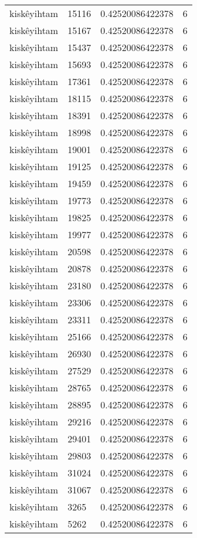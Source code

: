\begin{longtable}{llll}
kiskêyihtam & 15116 & 0.42520086422378 & 6 \\
kiskêyihtam & 15167 & 0.42520086422378 & 6 \\
kiskêyihtam & 15437 & 0.42520086422378 & 6 \\
kiskêyihtam & 15693 & 0.42520086422378 & 6 \\
kiskêyihtam & 17361 & 0.42520086422378 & 6 \\
kiskêyihtam & 18115 & 0.42520086422378 & 6 \\
kiskêyihtam & 18391 & 0.42520086422378 & 6 \\
kiskêyihtam & 18998 & 0.42520086422378 & 6 \\
kiskêyihtam & 19001 & 0.42520086422378 & 6 \\
kiskêyihtam & 19125 & 0.42520086422378 & 6 \\
kiskêyihtam & 19459 & 0.42520086422378 & 6 \\
kiskêyihtam & 19773 & 0.42520086422378 & 6 \\
kiskêyihtam & 19825 & 0.42520086422378 & 6 \\
kiskêyihtam & 19977 & 0.42520086422378 & 6 \\
kiskêyihtam & 20598 & 0.42520086422378 & 6 \\
kiskêyihtam & 20878 & 0.42520086422378 & 6 \\
kiskêyihtam & 23180 & 0.42520086422378 & 6 \\
kiskêyihtam & 23306 & 0.42520086422378 & 6 \\
kiskêyihtam & 23311 & 0.42520086422378 & 6 \\
kiskêyihtam & 25166 & 0.42520086422378 & 6 \\
kiskêyihtam & 26930 & 0.42520086422378 & 6 \\
kiskêyihtam & 27529 & 0.42520086422378 & 6 \\
kiskêyihtam & 28765 & 0.42520086422378 & 6 \\
kiskêyihtam & 28895 & 0.42520086422378 & 6 \\
kiskêyihtam & 29216 & 0.42520086422378 & 6 \\
kiskêyihtam & 29401 & 0.42520086422378 & 6 \\
kiskêyihtam & 29803 & 0.42520086422378 & 6 \\
kiskêyihtam & 31024 & 0.42520086422378 & 6 \\
kiskêyihtam & 31067 & 0.42520086422378 & 6 \\
kiskêyihtam & 3265 & 0.42520086422378 & 6 \\
kiskêyihtam & 5262 & 0.42520086422378 & 6 \\

\end{longtable}
